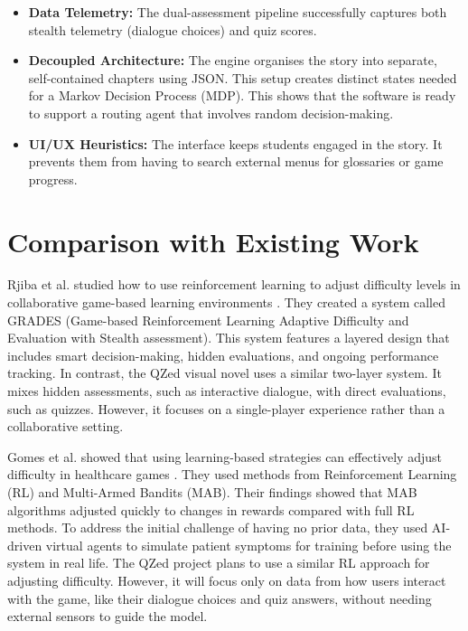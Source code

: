 \documentclass[12pt,a4paper]{report}
\begin{document}
\begin{itemize}
    \item \textbf{Data Telemetry:} The dual-assessment pipeline successfully captures both stealth telemetry (dialogue choices) and quiz scores.

    \item \textbf{Decoupled Architecture:} The engine organises the story into separate, self-contained chapters using JSON. This setup creates distinct states needed for a Markov Decision Process (MDP). This shows that the software is ready to support a routing agent that involves random decision-making.

    \item \textbf{UI/UX Heuristics:} The interface keeps students engaged in the story. It prevents them from having to search external menus for glossaries or game progress.
\end{itemize}


\section{Comparison with Existing Work}

\quad Rjiba et al. studied how to use reinforcement learning to adjust difficulty levels in collaborative game-based learning environments \cite{7}. They created a system called GRADES (Game-based Reinforcement Learning Adaptive Difficulty and Evaluation with Stealth assessment). This system features a layered design that includes smart decision-making, hidden evaluations, and ongoing performance tracking. In contrast, the QZed visual novel uses a similar two-layer system. It mixes hidden assessments, such as interactive dialogue, with direct evaluations, such as quizzes. However, it focuses on a single-player experience rather than a collaborative setting.

\quad Gomes et al. showed that using learning-based strategies can effectively adjust difficulty in healthcare games \cite{11}. They used methods from Reinforcement Learning (RL) and Multi-Armed Bandits (MAB). Their findings showed that MAB algorithms adjusted quickly to changes in rewards compared with full RL methods. To address the initial challenge of having no prior data, they used AI-driven virtual agents to simulate patient symptoms for training before using the system in real life. The QZed project plans to use a similar RL approach for adjusting difficulty. However, it will focus only on data from how users interact with the game, like their dialogue choices and quiz answers, without needing external sensors to guide the model.
\end{document}
